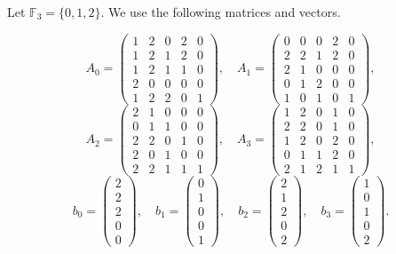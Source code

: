 \documentclass[11pt]{article}
\theoremstyle{definition}
\theoremstyle{remark}
\renewcommand{\_}{\textunderscore\allowbreak}
\begin{document}
Let \(\mathbb F_3=\{0,1,2\}\). We use the following matrices and
vectors.

\[
A_0=\begin{pmatrix}
1&2&0&2&0\\
1&2&1&2&0\\
1&2&1&1&0\\
2&0&0&0&0\\
1&2&2&0&1
\end{pmatrix},\quad
A_1=\begin{pmatrix}
0&0&0&2&0\\
2&2&1&2&0\\
2&1&0&0&0\\
0&1&2&0&0\\
1&0&1&0&1
\end{pmatrix},
\] \[
A_2=\begin{pmatrix}
2&1&0&0&0\\
0&1&1&0&0\\
2&2&0&1&0\\
2&0&1&0&0\\
2&2&1&1&1
\end{pmatrix},\quad
A_3=\begin{pmatrix}
1&2&0&1&0\\
2&2&0&1&0\\
1&2&0&2&0\\
0&1&1&2&0\\
2&1&2&1&1
\end{pmatrix},
\] \[
b_0=\begin{pmatrix}2\\2\\2\\0\\0\end{pmatrix},\quad
b_1=\begin{pmatrix}0\\1\\0\\0\\1\end{pmatrix},\quad
b_2=\begin{pmatrix}2\\1\\2\\0\\2\end{pmatrix},\quad
b_3=\begin{pmatrix}1\\0\\1\\0\\2\end{pmatrix}.
\]
\end{document}
